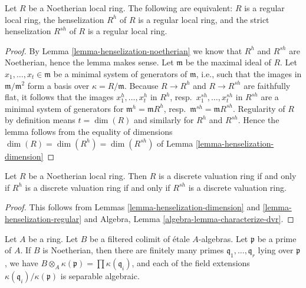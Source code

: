 \begin{lemma}
\label{lemma-henselization-regular}
Let $R$ be a Noetherian local ring. The following are equivalent:
$R$ is a regular local ring, the henselization $R^h$ of $R$ is a regular
local ring, and the strict henselization $R^{sh}$ of $R$ is a regular
local ring.
\end{lemma}

\begin{proof}
By
Lemma \ref{lemma-henselization-noetherian}
we know that $R^h$ and $R^{sh}$ are Noetherian, hence the lemma makes
sense. Let $\mathfrak m$ be the maximal ideal of $R$.
Let $x_1, \ldots, x_t \in \mathfrak m$ be a minimal system of
generators of $\mathfrak m$, i.e., such that the images in
$\mathfrak m/\mathfrak m^2$ form a basis over $\kappa = R/\mathfrak m$.
Because $R \to R^h$ and $R \to R^{sh}$ are faithfully flat, it follows
that the images $x_1^h, \ldots, x_t^h$ in $R^h$,
resp.\  $x_1^{sh}, \ldots, x_t^{sh}$ in $R^{sh}$
are a minimal system of generators for
$\mathfrak m^h = \mathfrak mR^h$,
resp.\ $\mathfrak m^{sh} = \mathfrak mR^{sh}$.
Regularity of $R$ by definition means $t = \dim(R)$ and similarly
for $R^h$ and $R^{sh}$. Hence the lemma follows from the equality
of dimensions $\dim(R) = \dim(R^h) = \dim(R^{sh})$ of
Lemma \ref{lemma-henselization-dimension}
\end{proof}

\begin{lemma}
\label{lemma-henselization-dvr}
Let $R$ be a Noetherian local ring. Then $R$ is a discrete valuation ring
if and only if $R^h$ is a discrete valuation ring if and only if
$R^{sh}$ is a discrete valuation ring.
\end{lemma}

\begin{proof}
This follows from Lemmas \ref{lemma-henselization-dimension} and
\ref{lemma-henselization-regular} and
Algebra, Lemma \ref{algebra-lemma-characterize-dvr}.
\end{proof}

\begin{lemma}
\label{lemma-filtered-colimit-etale-noetherian-fibres}
Let $A$ be a ring. Let $B$ be a filtered colimit of \'etale $A$-algebras.
Let $\mathfrak p$ be a prime of $A$. If $B$ is Noetherian, then
there are finitely many primes $\mathfrak q_1, \ldots, \mathfrak q_r$
lying over $\mathfrak p$, we have
$B \otimes_A \kappa(\mathfrak p) = \prod \kappa(\mathfrak q_i)$, and
each of the field extensions
$\kappa(\mathfrak q_i)/\kappa(\mathfrak p)$ is separable algebraic.
\end{lemma}

